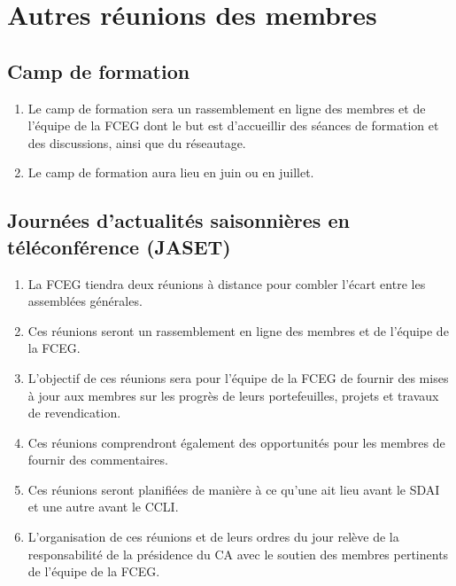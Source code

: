 \section{Autres réunions des membres}
\label{autres-reunions-des-membres}

\subsection{Camp de formation}
\label{autres-reunions-des-membres-camp-de-formation}

\begin{enumerate}
 \item Le camp de formation sera un rassemblement en ligne des membres et de l'équipe de la FCEG dont le but est d'accueillir des séances de formation et des discussions, ainsi que du réseautage.
 \item Le camp de formation aura lieu en juin ou en juillet.
\end{enumerate}

\subsection{Journées d’actualités saisonnières en téléconférence (JASET)}
\label{autres-reunions-des-membres-journees-d-actualites-saisonnieres-en-teleconference-jaset}

\begin{enumerate}
 \item La FCEG tiendra deux réunions à distance pour combler l'écart entre les assemblées générales.
 \item Ces réunions seront un rassemblement en ligne des membres et de l'équipe de la FCEG.
 \item L'objectif de ces réunions sera pour l'équipe de la FCEG de fournir des mises à jour aux membres sur les progrès de leurs portefeuilles, projets et travaux de revendication.
 \item Ces réunions comprendront également des opportunités pour les membres de fournir des commentaires.
 \item Ces réunions seront planifiées de manière à ce qu'une ait lieu avant le SDAI et une autre avant le CCLI.
 \item L'organisation de ces réunions et de leurs ordres du jour relève de la responsabilité de la présidence du CA avec le soutien des membres pertinents de l'équipe de la FCEG.
\end{enumerate}

